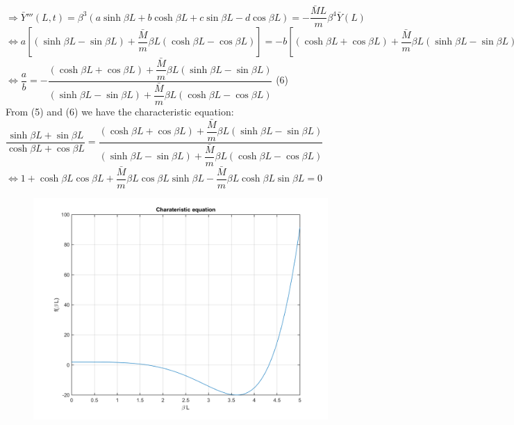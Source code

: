 \documentclass[14pt,a4paper]{article}
\begin{document}
\begin{enumerate}
	$\Rightarrow \bar{Y}'''(L,t) = \beta^3 \left(a \sinh \beta L + b \cosh \beta L + c \sin \beta L - d \cos \beta L\right) = -\dfrac{\bar{M}L}{m}\beta^4\bar{Y}(L)$ \\ 
	$\Leftrightarrow a\left[(\sinh\beta L - \sin\beta L)+\dfrac{\bar{M}}{m}\beta L(\cosh\beta L - \cos\beta L)\right] = -b\left[(\cosh\beta L + \cos\beta L) +\dfrac{\bar{M}}{m}\beta L(\sinh\beta L - \sin\beta L)\right]$\\
	$\Leftrightarrow \dfrac{a}{b} = -\dfrac{(\cosh\beta L + \cos\beta L) +\dfrac{\bar{M}}{m}\beta L(\sinh\beta L - \sin\beta L)}{(\sinh\beta L - \sin\beta L)+\dfrac{\bar{M}}{m}\beta L(\cosh\beta L - \cos\beta L)} $ \hspace{3.8cm} (6) \\
	 
	From (5) and (6) we have the characteristic equation:\\
	$ \dfrac{ \sinh\beta L + \sin \beta L}{\cosh \beta L + \cos \beta L} = \dfrac{(\cosh\beta L + \cos\beta L) +\dfrac{\bar{M}}{m}\beta L(\sinh\beta L - \sin\beta L)}{(\sinh\beta L - \sin\beta L)+\dfrac{\bar{M}}{m}\beta L(\cosh\beta L - \cos\beta L)} $\\
	$\Leftrightarrow 1 + \cosh\beta L\cos\beta L + \dfrac{\bar{M}}{m}\beta L\cos\beta L\sinh\beta L - \dfrac{\bar{M}}{m}\beta L\cosh\beta L\sin\beta L = 0$
	\begin{figure}[htp]
		\centering
		\includegraphics[scale=0.4]{fn1_VB1_1.png}

\end{figure}
\end{enumerate}
\end{document}
